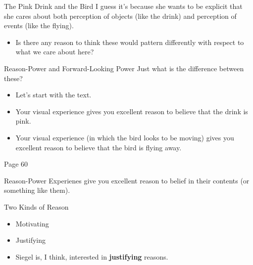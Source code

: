 \documentclass[
  17pt,
  letterpaper,
  ignorenonframetext,
  aspectratio=169,
  handout,
  xcolor={dvipsnames}]{beamer}
\providecommand{\tightlist}{%
  \setlength{\itemsep}{0pt}\setlength{\parskip}{0pt}}\usepackage{longtable,booktabs,array}
\begin{document}
\begin{frame}{The Pink Drink and the Bird}
\protect\hypertarget{the-pink-drink-and-the-bird-1}{}
I guess it's because she wants to be explicit that she cares about both
perception of objects (like the drink) and perception of events (like
the flying).

\begin{itemize}[<+->]
\tightlist
\item
  Is there any reason to think these would pattern differently with
  respect to what we care about here?
\end{itemize}
\end{frame}

\begin{frame}{Reason-Power and Forward-Looking Power}
\protect\hypertarget{reason-power-and-forward-looking-power}{}
Just what is the difference between these?

\begin{itemize}[<+->]
\tightlist
\item
  Let's start with the text.
\end{itemize}

\end{frame} \begin{frame}[plain]

\begin{itemize}[<+->]
\tightlist
\item
  Your visual experience gives you excellent reason to believe that the
  drink is pink.
\item
  Your visual experience (in which the bird looks to be moving) gives
  you excellent reason to believe that the bird is flying away.
\end{itemize}

Page 60
\end{frame}

\begin{frame}{Reason-Power}
\protect\hypertarget{reason-power}{}
Experienes give you excellent reason to belief in their contents (or
something like them).
\end{frame}

\begin{frame}{Two Kinds of Reason}
\protect\hypertarget{two-kinds-of-reason}{}
\begin{itemize}[<+->]
\tightlist
\item
  Motivating
\item
  Justifying
\item
  Siegel is, I think, interested in \textbf{justifying} reasons.
\end{itemize}
\end{frame}
\end{document}
